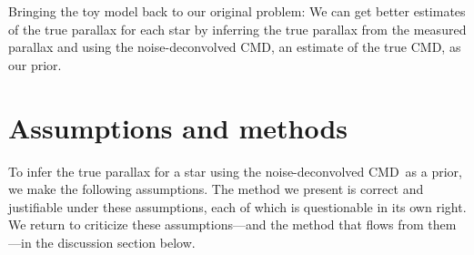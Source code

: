 \documentclass[modern]{aastex61}
\newcommand{\acronym}[1]{{\small{#1}}}
\newcommand{\cmd}{\acronym{CMD}}
\begin{document}
Bringing the toy model back to our original problem:
We can get better estimates of the true parallax for each star by inferring the true parallax from the measured parallax and using the noise-deconvolved \cmd, an estimate of the true \cmd, as our prior.

\section{Assumptions and methods}\label{sec:method}

To infer the true parallax for a star using the noise-deconvolved \cmd\ as
a prior, we make the following assumptions. The method we present is correct
and justifiable under these assumptions, each of which is questionable
in its own right. We return to criticize these assumptions---and the
method that flows from them---in the discussion section below.
\end{document}

